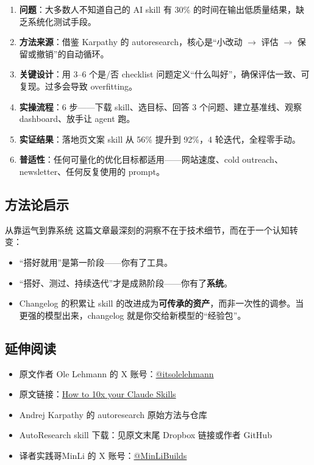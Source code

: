 \documentclass[a4paper]{article}
\begin{document}
\begin{enumerate}
    \item \textbf{问题}：大多数人不知道自己的 AI skill 有 30\% 的时间在输出低质量结果，缺乏系统化测试手段。
    \item \textbf{方法来源}：借鉴 Karpathy 的 autoresearch，核心是``小改动 $\to$ 评估 $\to$ 保留或撤销''的自动循环。
    \item \textbf{关键设计}：用 3--6 个是/否 checklist 问题定义``什么叫好''，确保评估一致、可复现。过多会导致 overfitting。
    \item \textbf{实操流程}：6 步——下载 skill、选目标、回答 3 个问题、建立基准线、观察 dashboard、放手让 agent 跑。
    \item \textbf{实证结果}：落地页文案 skill 从 56\% 提升到 92\%，4 轮迭代，全程零手动。
    \item \textbf{普适性}：任何可量化的优化目标都适用——网站速度、cold outreach、newsletter、任何反复使用的 prompt。
\end{enumerate}

\subsection{方法论启示}

\begin{importantbox}{从靠运气到靠系统}
这篇文章最深刻的洞察不在于技术细节，而在于一个认知转变：
\begin{itemize}
    \item ``搭好就用''是第一阶段——你有了工具。
    \item ``搭好、测过、持续迭代''才是成熟阶段——你有了\textbf{系统}。
    \item Changelog 的积累让 skill 的改进成为\textbf{可传承的资产}，而非一次性的调参。当更强的模型出来，changelog 就是你交给新模型的``经验包''。
\end{itemize}
\end{importantbox}

\subsection{延伸阅读}

\begin{itemize}
    \item 原文作者 Ole Lehmann 的 X 账号：\href{https://x.com/itsolelehmann}{@itsolelehmann}
    \item 原文链接：\href{https://x.com/itsolelehmann/status/2033919415771713715}{How to 10x your Claude Skills}
    \item Andrej Karpathy 的 autoresearch 原始方法与仓库
    \item AutoResearch skill 下载：见原文末尾 Dropbox 链接或作者 GitHub
    \item 译者实践哥MinLi 的 X 账号：\href{https://x.com/MinLiBuilds}{@MinLiBuilds}
\end{itemize}

\end{document}
